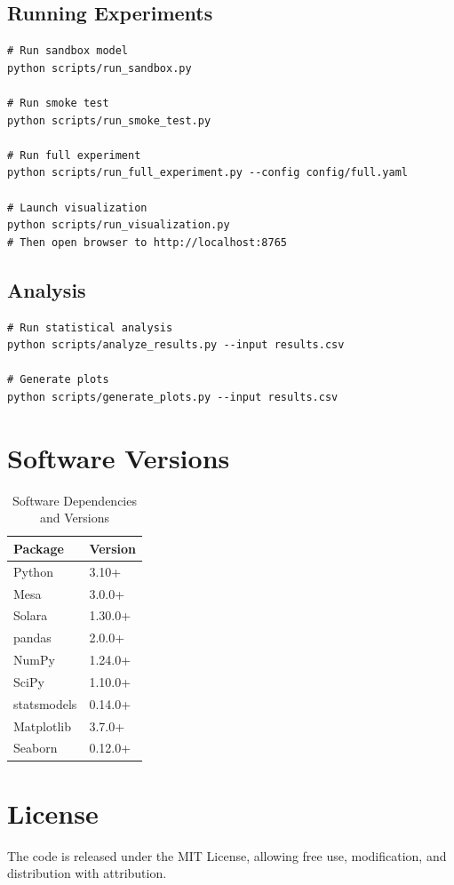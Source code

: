 \subsection{Running Experiments}

\begin{verbatim}
# Run sandbox model
python scripts/run_sandbox.py

# Run smoke test
python scripts/run_smoke_test.py

# Run full experiment
python scripts/run_full_experiment.py --config config/full.yaml

# Launch visualization
python scripts/run_visualization.py
# Then open browser to http://localhost:8765
\end{verbatim}

\subsection{Analysis}

\begin{verbatim}
# Run statistical analysis
python scripts/analyze_results.py --input results.csv

# Generate plots
python scripts/generate_plots.py --input results.csv
\end{verbatim}

\section{Software Versions}

\begin{table}[h]
\centering
\caption{Software Dependencies and Versions}
\begin{tabular}{ll}
\toprule
\textbf{Package} & \textbf{Version} \\
\midrule
Python & 3.10+ \\
Mesa & 3.0.0+ \\
Solara & 1.30.0+ \\
pandas & 2.0.0+ \\
NumPy & 1.24.0+ \\
SciPy & 1.10.0+ \\
statsmodels & 0.14.0+ \\
Matplotlib & 3.7.0+ \\
Seaborn & 0.12.0+ \\
\bottomrule
\end{tabular}
\end{table}

\section{License}

The code is released under the MIT License, allowing free use, modification, and distribution with attribution.

